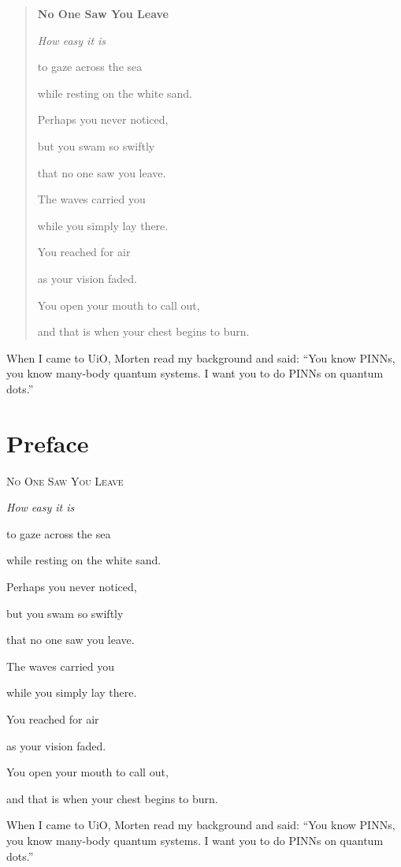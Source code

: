 \begin{quote}
\centering
\textbf{No One Saw You Leave}\par\medskip
\itshape
How easy it is\par
to gaze across the sea\par
while resting on the white sand.\par\medskip
Perhaps you never noticed,\par
but you swam so swiftly\par
that no one saw you leave.\par\medskip
The waves carried you\par
while you simply lay there.\par
You reached for air\par
as your vision faded.\par\medskip
You open your mouth to call out,\par
and that is when your chest begins to burn.
\end{quote}

When I came to UiO, Morten read my background and said: ``You know PINNs, you know
many-body quantum systems. I want you to do PINNs on quantum dots.''



\begingroup
\let\clearpage\relax
\let\cleardoublepage\relax
\chapter*{Preface}
\endgroup
{}

\thispagestyle{empty}
\vspace*{\fill}
\begin{center}
\begin{minipage}{0.62\textwidth}
\centering
\textsc{No One Saw You Leave}\par\bigskip
\itshape
How easy it is\par
to gaze across the sea\par
while resting on the white sand.\par\medskip
Perhaps you never noticed,\par
but you swam so swiftly\par
that no one saw you leave.\par\medskip
The waves carried you\par
while you simply lay there.\par
You reached for air\par
as your vision faded.\par\medskip
You open your mouth to call out,\par
and that is when your chest begins to burn.
\end{minipage}
\end{center}
\vspace*{\fill}
\clearpage

When I came to UiO, Morten read my background and said: ``You know PINNs, you know
many-body quantum systems. I want you to do PINNs on quantum dots.''